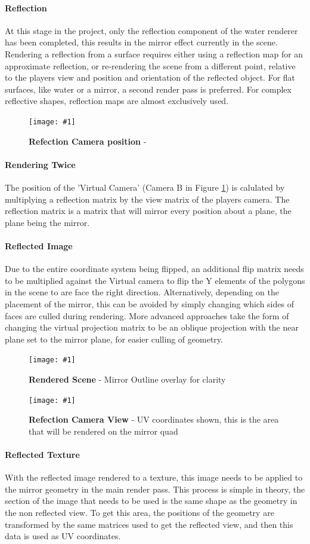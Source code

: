 \documentclass[conference]{acmsiggraph}
\newcommand{\figuremacroW}[4]{
	\begin{figure}[h] %
		\centering
		\texttt{[image: \#1]}
		\caption[#2]{\textbf{#2} - #3}
		\label{fig:#1}
	\end{figure}
}
\begin{document}
\paragraph{Reflection}
At this stage in the project, only the reflection component of the water renderer has been completed, this results in the mirror effect currently in the scene. Rendering a reflection from a surface requires either using a reflection map for an approximate reflection, or re-rendering the scene from a different point, relative to the players view and position and orientation of the reflected object.
For flat surfaces, like water or a mirror, a second render pass is preferred. For complex reflective shapes, reflection maps are almost exclusively used.


\figuremacroW
{reflections}
{Refection Camera position}
{\protect\cite{Riemer}}
{1.0}

\paragraph{Rendering Twice}
The position of the 'Virtual Camera' (Camera B in Figure \ref{fig:reflections}) is calulated by multiplying a reflection matrix by the view matrix of the players camera. The reflection matrix is a matrix that will mirror every position about a plane, the plane being the mirror.

\paragraph{Reflected Image}
Due to the entire coordinate system being flipped, an additional flip matrix needs to be multiplied against the Virtual camera to flip the Y elements of the polygons in the scene to are face the right direction. Alternatively, depending on the placement of the mirror, this can be avoided by simply changing which sides of faces are culled during rendering. More advanced approaches take the form of changing the virtual projection matrix to be an oblique projection with the near plane set to the mirror plane, for easier culling of geometry.

\figuremacroW
{front-Buffer}
{Rendered Scene}
{Mirror Outline overlay for clarity}
{1.0}

\figuremacroW
{ref-Buffer}
{Refection Camera View}
{UV coordinates shown, this is the area that will be rendered on the mirror quad}
{1.0}

\paragraph{Reflected Texture}
With the reflected image rendered to a texture, this image needs to be applied to the mirror geometry in the main render pass.
This process is simple in theory, the section of the image that needs to be used is the same shape as the geometry in the non reflected view.
To get this area, the positions of the geometry are transformed by the same matrices used to get the reflected view, and then this data is used as UV coordinates.
\end{document}

